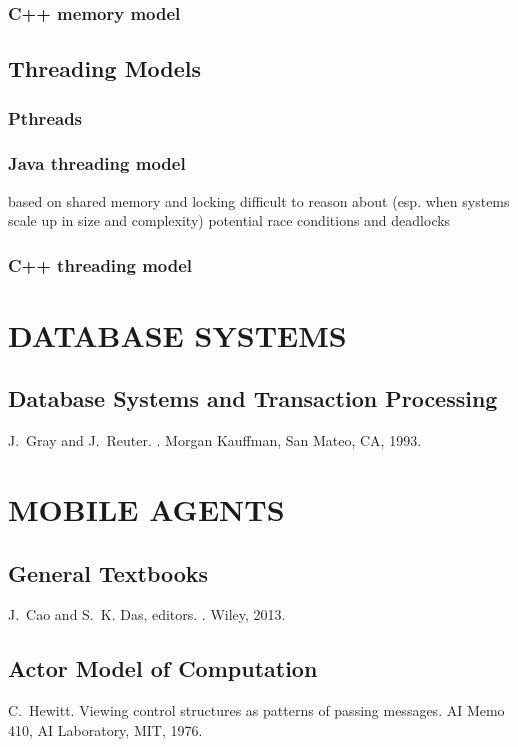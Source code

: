\documentclass{myproc}
\begin{document}
\subsubsection{C++ memory model}

\subsection{Threading Models}
\subsubsection{Pthreads}
\subsubsection{Java threading model}
\bit
\w based on shared memory and locking
\w difficult to reason about (esp. when systems scale up in size and
complexity)
\w potential race conditions and deadlocks
\eit
\subsubsection{C++ threading model}



\section{DATABASE SYSTEMS}
\subsection{Database Systems and Transaction Processing}
\bit
\w J.~Gray and J.~Reuter.
.
\newblock Morgan Kauffman, San Mateo, CA, 1993.
\eit

\section{MOBILE AGENTS}
\subsection{General Textbooks}
\bit
\w J.~Cao and S.~K. Das, editors.
.
\newblock Wiley, 2013.


\eit

\subsection{\textcolor{red2}{\bf{}Actor Model of Computation}}
\bit
\w C.~Hewitt.
\newblock Viewing control structures as patterns of passing messages.
\newblock AI Memo 410, AI Laboratory, MIT, 1976.
\end{document}
